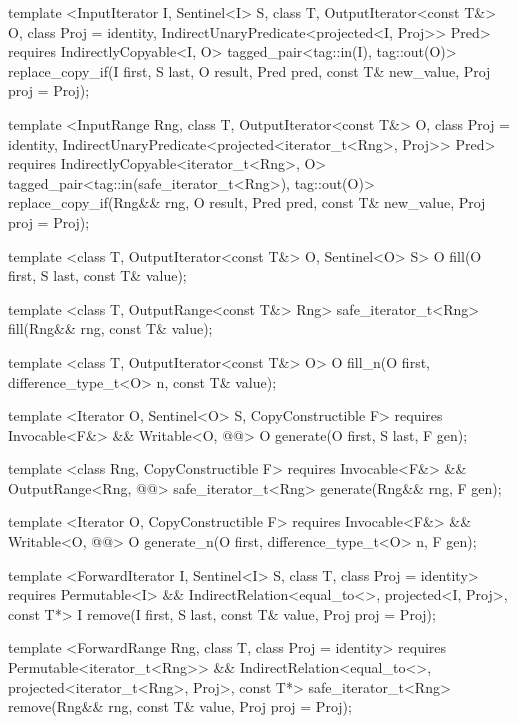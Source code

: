 {\begin{codeblock}
{{    template <InputIterator I, Sentinel<I> S, class T, OutputIterator<const T&> O,
        class Proj = identity, IndirectUnaryPredicate<projected<I, Proj>> Pred>
      requires IndirectlyCopyable<I, O>
      tagged_pair<tag::in(I), tag::out(O)>
        replace_copy_if(I first, S last, O result, Pred pred, const T& new_value,
                        Proj proj = Proj{});

    template <InputRange Rng, class T, OutputIterator<const T&> O, class Proj = identity,
        IndirectUnaryPredicate<projected<iterator_t<Rng>, Proj>> Pred>
      requires IndirectlyCopyable<iterator_t<Rng>, O>
      tagged_pair<tag::in(safe_iterator_t<Rng>), tag::out(O)>
        replace_copy_if(Rng&& rng, O result, Pred pred, const T& new_value,
                        Proj proj = Proj{});

    template <class T, OutputIterator<const T&> O, Sentinel<O> S>
      O fill(O first, S last, const T& value);

    template <class T, OutputRange<const T&> Rng>
      safe_iterator_t<Rng>
        fill(Rng&& rng, const T& value);

    template <class T, OutputIterator<const T&> O>
      O fill_n(O first, difference_type_t<O> n, const T& value);

    template <Iterator O, Sentinel<O> S, CopyConstructible F>
        requires Invocable<F&> && Writable<O, @@>
      O generate(O first, S last, F gen);

    template <class Rng, CopyConstructible F>
        requires Invocable<F&> && OutputRange<Rng, @@>
      safe_iterator_t<Rng>
        generate(Rng&& rng, F gen);

    template <Iterator O, CopyConstructible F>
        requires Invocable<F&> && Writable<O, @@>
      O generate_n(O first, difference_type_t<O> n, F gen);

    template <ForwardIterator I, Sentinel<I> S, class T, class Proj = identity>
      requires Permutable<I> &&
        IndirectRelation<equal_to<>, projected<I, Proj>, const T*>
      I remove(I first, S last, const T& value, Proj proj = Proj{});

    template <ForwardRange Rng, class T, class Proj = identity>
      requires Permutable<iterator_t<Rng>> &&
        IndirectRelation<equal_to<>, projected<iterator_t<Rng>, Proj>, const T*>
      safe_iterator_t<Rng>
        remove(Rng&& rng, const T& value, Proj proj = Proj{});

}}
\end{codeblock}}
